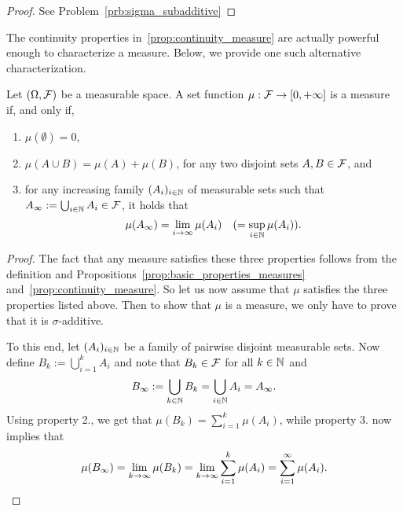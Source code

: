 \begin{proof}
See Problem~\ref{prb:sigma_subadditive}
\end{proof}

The continuity properties in~\ref{prop:continuity_measure} are actually powerful enough to characterize a measure. Below, we provide one such alternative characterization. %



\begin{theorem}
Let $(\Omega, \mathcal F)$ be a measurable space. A set function $\mu : \mathcal F \to [0,+\infty]$ is a measure if, and only if,
\begin{enumerate}
\item $\mu(\emptyset) = 0$,
\item $\mu(A \cup B) = \mu(A) + \mu(B)$, for any two disjoint sets $A, B \in \mathcal F$, and
\item for any increasing family $(A_i)_{i \in \mathbb N}$ of measurable sets such that $A_\infty := \bigcup_{i \in \mathbb N} A_i \in \mathcal F$, it holds that
\[
	\mu(A_\infty) = \lim_{i \to \infty} \mu(A_i) \quad (= \sup_{i \in \mathbb N} \mu(A_i)).
\]
\end{enumerate}
\end{theorem}

\begin{proof}
The fact that any measure satisfies these three properties follows from the definition and Propositions~\ref{prop:basic_properties_measures} and~\ref{prop:continuity_measure}. So let us now assume that $\mu$ satisfies the three properties listed above. Then to show that $\mu$ is a measure, we only have to prove that it is $\sigma$-additive.

To this end, let $(A_i)_{i \in \mathbb N}$ be a family of pairwise disjoint measurable sets. Now define $B_k := \bigcup_{i = 1}^k A_i$ and note that $B_k \in \mathcal F$ for all $k \in \mathbb N$ and
\[
	B_\infty := \bigcup_{k \in \mathbb N} B_k = \bigcup_{i \in \mathbb N} A_i = A_\infty.
\]
Using property 2., we get that $\mu(B_k) = \sum_{i = 1}^k \mu(A_i)$, while property 3. now implies that
\[
	\mu(B_\infty) = \lim_{k \to \infty} \mu(B_k) = \lim_{k \to \infty} \sum_{i = 1}^k \mu(A_i) = \sum_{i = 1}^\infty \mu(A_i). \qedhere
\]
\end{proof}

